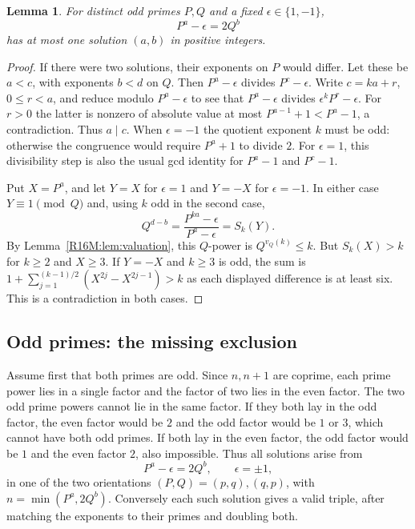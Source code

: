 \documentclass[11pt,a4paper]{article}
\newtheorem{SourceRbgMlemma}[SourceRbgMtheorem]{Lemma}
\begin{document}
\begin{SourceRbgMlemma}\label{R16M:lem:branches}
For distinct odd primes $P,Q$ and a fixed $\epsilon\in\{1,-1\}$,
\[
                       P^a-\epsilon=2Q^b
\]
has at most one solution $(a,b)$ in positive integers.
\end{SourceRbgMlemma}
\begin{proof}
If there were two solutions, their exponents on $P$ would
differ. Let these be $a<c$, with exponents $b<d$ on $Q$.
Then $P^a-\epsilon$ divides $P^c-\epsilon$. Write $c=ka+r$,
$0\le r<a$, and reduce modulo $P^a-\epsilon$ to see that
$P^a-\epsilon$ divides $\epsilon^k P^r-\epsilon$.
For $r>0$ the latter is nonzero of absolute value at most
$P^{a-1}+1<P^a-1$, a contradiction. Thus $a\mid c$.
When $\epsilon=-1$ the quotient exponent $k$ must be odd:
otherwise the congruence would require $P^a+1$ to divide $2$.
For $\epsilon=1$, this divisibility step is also the usual
gcd identity for $P^a-1$ and $P^c-1$.

Put $X=P^a$, and let $Y=X$ for $\epsilon=1$ and $Y=-X$
for $\epsilon=-1$. In either case $Y\equiv1\pmod Q$ and, using
$k$ odd in the second case,
\[
             Q^{d-b}=\frac{P^{ka}-\epsilon}{P^a-\epsilon}=S_k(Y).
\]
By Lemma~\ref{R16M:lem:valuation}, this $Q$-power is
$Q^{v_Q(k)}\le k$. But $S_k(X)>k$ for $k\ge2$ and $X\ge3$.
If $Y=-X$ and $k\ge3$ is odd, the sum is
$1+\sum_{j=1}^{(k-1)/2}(X^{2j}-X^{2j-1})>k$
as each displayed difference is at least six. This is a
contradiction in both cases.
\end{proof}

\subsection{Odd primes: the missing exclusion}
Assume first that both primes are odd. Since $n,n+1$ are
coprime, each prime power lies in a single factor and the
factor of two lies in the even factor. The two odd prime
powers cannot lie in the same factor. If they both lay in the
odd factor, the even factor would be $2$ and the odd factor
would be $1$ or $3$, which cannot have both odd primes.
If both lay in the even factor, the odd factor would be $1$
and the even factor $2$, also impossible. Thus all solutions
arise from
\[
               P^a-\epsilon=2Q^b,\qquad \epsilon=\pm 1,
\]
in one of the two orientations $(P,Q)=(p,q),(q,p)$, with
$n=\min(P^a,2Q^b)$. Conversely each such solution gives a valid
triple, after matching the exponents to their primes and
doubling both.
\end{document}

